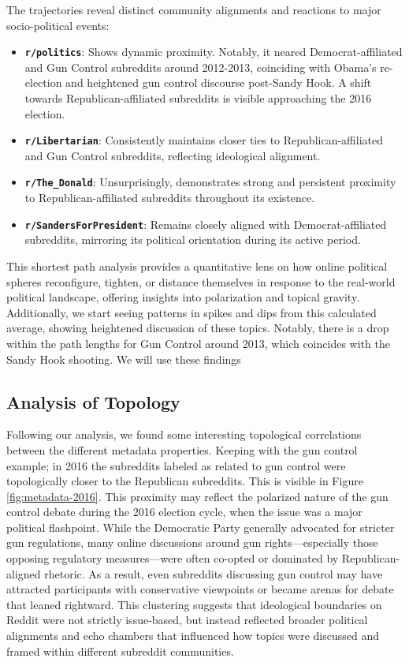 \documentclass{article}
\theoremstyle{definition}
\begin{document}
The trajectories reveal distinct community alignments and reactions to major socio-political events:
\begin{itemize}
    \item \textbf{\texttt{r/politics}}: Shows dynamic proximity. Notably, it neared Democrat-affiliated and Gun Control subreddits around 2012-2013, coinciding with Obama's re-election and heightened gun control discourse post-Sandy Hook. A shift towards Republican-affiliated subreddits is visible approaching the 2016 election.
    \item \textbf{\texttt{r/Libertarian}}: Consistently maintains closer ties to Republican-affiliated and Gun Control subreddits, reflecting ideological alignment.
    \item \textbf{\texttt{r/The\_Donald}}: Unsurprisingly, demonstrates strong and persistent proximity to Republican-affiliated subreddits throughout its existence.
    \item \textbf{\texttt{r/SandersForPresident}}: Remains closely aligned with Democrat-affiliated subreddits, mirroring its political orientation during its active period.
\end{itemize}
This shortest path analysis provides a quantitative lens on how online political spheres reconfigure, tighten, or distance themselves in response to the real-world political landscape, offering insights into polarization and topical gravity. Additionally, we start seeing patterns in spikes and dips from this calculated average, showing heightened discussion of these topics. Notably, there is a drop within the path lengths for Gun Control around 2013, which coincides with the Sandy Hook shooting. We will use these findings 

\subsection{Analysis of Topology}

Following our analysis, we found some interesting topological correlations between the different metadata properties. Keeping with the gun control example; in 2016 the subreddits labeled as related to gun control were topologically closer to the Republican subreddits. This is visible in Figure \ref{fig:metadata-2016}. This proximity may reflect the polarized nature of the gun control debate during the 2016 election cycle, when the issue was a major political flashpoint. While the Democratic Party generally advocated for stricter gun regulations, many online discussions around gun rights—especially those opposing regulatory measures—were often co-opted or dominated by Republican-aligned rhetoric. As a result, even subreddits discussing gun control may have attracted participants with conservative viewpoints or became arenas for debate that leaned rightward. This clustering suggests that ideological boundaries on Reddit were not strictly issue-based, but instead reflected broader political alignments and echo chambers that influenced how topics were discussed and framed within different subreddit communities.
\end{document}
